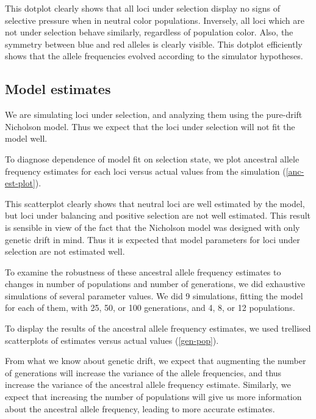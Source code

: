 \documentclass[a4paper,12pt]{article}
\begin{document}
This dotplot clearly shows that all loci under selection display no
signs of selective pressure when in neutral color
populations. Inversely, all loci which are not under selection behave
similarly, regardless of population color. Also, the symmetry between
blue and red alleles is clearly visible. This dotplot efficiently
shows that the allele frequencies evolved according to the simulator
hypotheses.

\subsection{Model estimates}

We are simulating loci under selection, and analyzing them using the
pure-drift Nicholson model. Thus we expect that the loci under
selection will not fit the model well.

To diagnose dependence of model fit on selection state, we plot
ancestral allele frequency estimates for each loci versus actual
values from the simulation (\autoref{anc-est-plot}).


This scatterplot clearly shows that neutral loci are well estimated by
the model, but loci under balancing and positive selection are not
well estimated. This result is sensible in view of the fact that the
Nicholson model was designed with only genetic drift in mind. Thus it
is expected that model parameters for loci under selection are not
estimated well.

To examine the robustness of these ancestral allele frequency
estimates to changes in number of populations and number of
generations, we did exhaustive simulations of several parameter
values. We did 9 simulations, fitting the model for each of them, with
25, 50, or 100 generations, and 4, 8, or 12 populations.

To display the results of the ancestral allele frequency estimates, we
used trellised scatterplots of estimates versus actual values
(\autoref{gen-pop}).


From what we know about genetic drift, we expect that augmenting the
number of generations will increase the variance of the allele
frequencies, and thus increase the variance of the ancestral allele
frequency estimate. Similarly, we expect that increasing the number of
populations will give us more information about the ancestral allele
frequency, leading to more accurate estimates.
\end{document}
